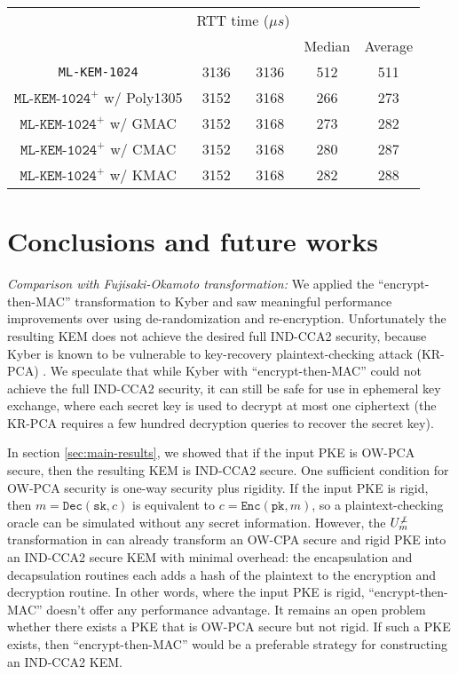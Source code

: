 \documentclass[journal=tches,submission]{iacrtrans}
\newcommand{\encrypt}{\texttt{Enc}}
\newcommand{\decrypt}{\texttt{Dec}}
\newcommand{\pk}{\texttt{pk}}
\newcommand{\sk}{\texttt{sk}}
\newcommand{\us}{\mu s}
\begin{document}
\begin{table}[H]
\begin{tabular}{|c|c|c|c|c|}
        & \multicolumn{2}{|c|}{RTT time ($\us$)} \\
        \cline{4-5}
        & & & Median & Average \\
        \hline
        \texttt{ML-KEM-1024} & 3136 & 3136 & 512 & 511 \\
        \hline
        $\texttt{ML-KEM-1024}^+$ w/ Poly1305 & 3152 & 3168 & 266 & 273 \\
        \hline
        $\texttt{ML-KEM-1024}^+$ w/ GMAC & 3152 & 3168 & 273 & 282 \\
        \hline
        $\texttt{ML-KEM-1024}^+$ w/ CMAC & 3152 & 3168 & 280 & 287 \\
        \hline
        $\texttt{ML-KEM-1024}^+$ w/ KMAC & 3152 & 3168 & 282 & 288 \\
        \hline
    \end{tabular}
\end{table}



\section{Conclusions and future works}\label{sec:future-works}
\emph{Comparison with Fujisaki-Okamoto transformation:} We applied the ``encrypt-then-MAC'' transformation to Kyber and saw meaningful performance improvements over using de-randomization and re-encryption. Unfortunately the resulting KEM does not achieve the desired full IND-CCA2 security, because Kyber is known to be vulnerable to key-recovery plaintext-checking attack (KR-PCA) \cite{ravi2019generic}\cite{ueno2022curse}. We speculate that while Kyber with ``encrypt-then-MAC'' could not achieve the full IND-CCA2 security, it can still be safe for use in ephemeral key exchange, where each secret key is used to decrypt at most one ciphertext (the KR-PCA requires a few hundred decryption queries to recover the secret key).

In section \ref{sec:main-results}, we showed that if the input PKE is OW-PCA secure, then the resulting KEM is IND-CCA2 secure. One sufficient condition for OW-PCA security is one-way security plus rigidity. If the input PKE is rigid, then $m = \decrypt(\sk, c)$ is equivalent to $c = \encrypt(\pk, m)$, so a plaintext-checking oracle can be simulated without any secret information. However, the $U_m^{\not\bot}$ transformation in \cite{hofheinz2017modular} can already transform an OW-CPA secure and rigid PKE into an IND-CCA2 secure KEM with minimal overhead: the encapsulation and decapsulation routines each adds a hash of the plaintext to the encryption and decryption routine. In other words, where the input PKE is rigid, ``encrypt-then-MAC'' doesn't offer any performance advantage. It remains an open problem whether there exists a PKE that is OW-PCA secure but not rigid. If such a PKE exists, then ``encrypt-then-MAC'' would be a preferable strategy for constructing an IND-CCA2 KEM.
\end{document}
